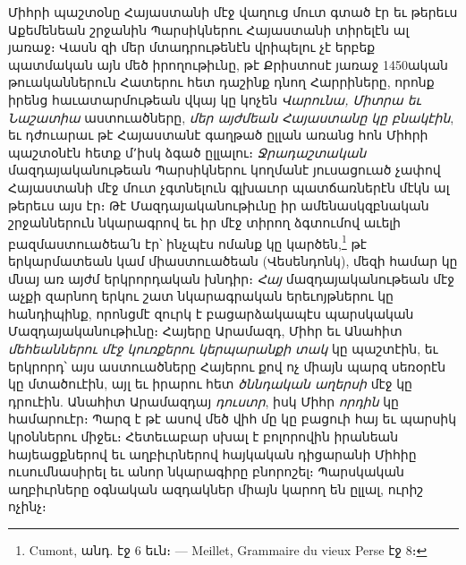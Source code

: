 \documentclass{article}
\begin{document}
{Միհրի պաշտօնը Հայաստանի մէջ վաղուց մուտ գտած էր եւ թերեւս Աքեմենեան շրջանին Պարսիկներու Հայաստանի տիրելէն ալ յառաջ։ Վասն զի մեր մտադրութենէն վրիպելու չէ երբեք պատմական այն մեծ իրողութիւնը, թէ Քրիստոսէ յառաջ 1450ական թուականներուն Հատերու հետ դաշինք դնող Հարրիները, որոնք իրենց հաւատարմութեան վկայ կը կոչեն \emph{Վարունա, Միտրա եւ Նաշատիա} աստուածները, \emph{մեր այժմեան Հայաստանը կը բնակէին}, եւ դժուարաւ թէ Հայաստանէ գաղթած ըլլան առանց հոն Միհրի պաշտօնէն հետք մ՚իսկ ձգած ըլլալու։ \emph{Ջրադաշտական} մազդայականութեան Պարսիկներու կողմանէ յուսացուած չափով Հայաստանի մէջ մուտ չգտնելուն գլխաւոր պատճառներէն մէկն ալ թերեւս այս էր։ Թէ Մազդայականութիւնը իր ամենասկզբնական շրջաններուն նկարագրով եւ իր մէջ տիրող ձգտումով աւելի բազմաստուածեա՛ն էր՝ ինչպէս ոմանք կը կարծեն,\footnote{Cumont, անդ. էջ 6 եւն։ — Meillet, Grammaire du vieux Perse էջ 8։} թէ երկարմատեան կամ միաստուածեան (Վեսենդոնկ), մեզի համար կը մնայ առ այժմ երկրորդական խնդիր։ \emph{Հայ} մազդայականութեան մէջ աչքի զարնող երկու շատ նկարագրական երեւոյթներու կը հանդիպինք, որոնցմէ զուրկ է բացարձակապէս պարսկական Մազդայականութիւնը։ Հայերը Արամազդ, Միհր եւ Անահիտ \emph{մեհեաններու մէջ կուռքերու կերպարանքի տակ} կը պաշտէին, եւ երկրորդ՝ այս աստուածները Հայերու քով ոչ միայն պարզ սեռօրէն կը մտածուէին, այլ եւ իրարու հետ \emph{ծննդական աղերսի} մէջ կը դրուէին. Անահիտ Արամազդայ \emph{դուստր}, իսկ Միհր \emph{որդին} կը համարուէր։ Պարզ է թէ ասով մեծ վիհ մը կը բացուի հայ եւ պարսիկ կրօններու միջեւ։ Հետեւաբար սխալ է բոլորովին իրանեան հայեացքներով եւ աղբիւրներով հայկական դիցարանի Միհիը ուսումնասիրել եւ անոր նկարագիրը բնորոշել։ Պարսկական աղբիւրները օգնական ազդակներ միայն կարող են ըլլալ, ուրիշ ոչինչ։

}
\end{document}
